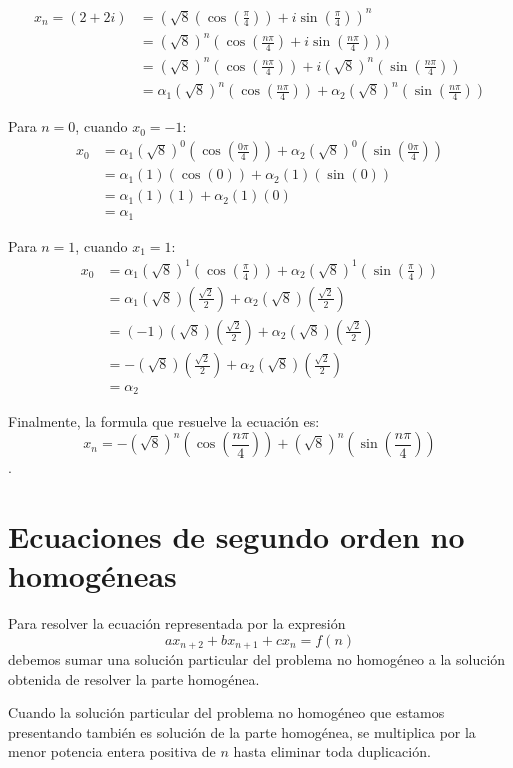\documentclass{report}
\begin{document}
\begin{align*}
  x_n=(2+2i)&=(\sqrt{8}(\cos(\frac{\pi}{4}))+i \sin(\frac{\pi}{4}))^n\\
  &=(\sqrt{8})^n(\cos(\frac{n\pi}{4})+i \sin(\frac{n\pi}{4})))\\
  &=(\sqrt{8})^n(\cos(\frac{n\pi}{4}))+i (\sqrt{8})^n(\sin(\frac{n\pi}{4}))\\
  &=\alpha_1(\sqrt{8})^n(\cos(\frac{n\pi}{4}))+\alpha_2(\sqrt{8})^n(\sin(\frac{n\pi}{4}))
\end{align*}

Para $n=0$, cuando $x_0=-1$:
\begin{align*}
  x_0&=\alpha_1(\sqrt{8})^0(\cos(\frac{0\pi}{4}))+\alpha_2(\sqrt{8})^0(\sin(\frac{0\pi}{4}))\\
  &=\alpha_1(1)(\cos(0))+\alpha_2(1)(\sin(0))\\
  &=\alpha_1(1)(1)+\alpha_2(1)(0)\\
  &=\alpha_1
\end{align*}

Para $n=1$, cuando $x_1=1$:
\begin{align*}
  x_0&=\alpha_1(\sqrt{8})^1(\cos(\frac{\pi}{4}))+\alpha_2(\sqrt{8})^1(\sin(\frac{\pi}{4}))\\
  &=\alpha_1(\sqrt{8})(\frac{\sqrt{2}}{2})+\alpha_2(\sqrt{8})(\frac{\sqrt{2}}{2})\\
  &=(-1)(\sqrt{8})(\frac{\sqrt{2}}{2})+\alpha_2(\sqrt{8})(\frac{\sqrt{2}}{2})\\
  &=-(\sqrt{8})(\frac{\sqrt{2}}{2})+\alpha_2(\sqrt{8})(\frac{\sqrt{2}}{2})\\
  &=\alpha_2
\end{align*}

Finalmente, la formula que resuelve la ecuación es:
$$x_n=-(\sqrt{8})^n(\cos(\frac{n\pi}{4}))+(\sqrt{8})^n(\sin(\frac{n\pi}{4}))$$.

\section{Ecuaciones de segundo orden no homogéneas}
\label{sec:nohomogeneas}

Para resolver la ecuación representada por la expresión
$$ax_{n+2}+bx_{n+1}+cx_{n}=f(n)$$ debemos sumar una solución particular
del problema no homogéneo a la solución obtenida de resolver la parte
homogénea.

Cuando la solución particular del problema no homogéneo que estamos
presentando también es solución de la parte homogénea, se multiplica
por la menor potencia entera positiva de $n$ hasta eliminar toda
duplicación.
\end{document}
